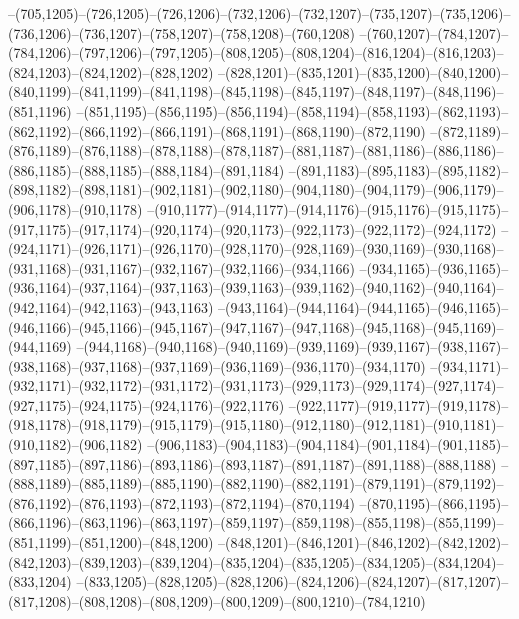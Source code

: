 --(705,1205)--(726,1205)--(726,1206)--(732,1206)--(732,1207)--(735,1207)--(735,1206)--(736,1206)--(736,1207)--(758,1207)--(758,1208)--(760,1208)
--(760,1207)--(784,1207)--(784,1206)--(797,1206)--(797,1205)--(808,1205)--(808,1204)--(816,1204)--(816,1203)--(824,1203)--(824,1202)--(828,1202)
--(828,1201)--(835,1201)--(835,1200)--(840,1200)--(840,1199)--(841,1199)--(841,1198)--(845,1198)--(845,1197)--(848,1197)--(848,1196)--(851,1196)
--(851,1195)--(856,1195)--(856,1194)--(858,1194)--(858,1193)--(862,1193)--(862,1192)--(866,1192)--(866,1191)--(868,1191)--(868,1190)--(872,1190)
--(872,1189)--(876,1189)--(876,1188)--(878,1188)--(878,1187)--(881,1187)--(881,1186)--(886,1186)--(886,1185)--(888,1185)--(888,1184)--(891,1184)
--(891,1183)--(895,1183)--(895,1182)--(898,1182)--(898,1181)--(902,1181)--(902,1180)--(904,1180)--(904,1179)--(906,1179)--(906,1178)--(910,1178)
--(910,1177)--(914,1177)--(914,1176)--(915,1176)--(915,1175)--(917,1175)--(917,1174)--(920,1174)--(920,1173)--(922,1173)--(922,1172)--(924,1172)
--(924,1171)--(926,1171)--(926,1170)--(928,1170)--(928,1169)--(930,1169)--(930,1168)--(931,1168)--(931,1167)--(932,1167)--(932,1166)--(934,1166)
--(934,1165)--(936,1165)--(936,1164)--(937,1164)--(937,1163)--(939,1163)--(939,1162)--(940,1162)--(940,1164)--(942,1164)--(942,1163)--(943,1163)
--(943,1164)--(944,1164)--(944,1165)--(946,1165)--(946,1166)--(945,1166)--(945,1167)--(947,1167)--(947,1168)--(945,1168)--(945,1169)--(944,1169)
--(944,1168)--(940,1168)--(940,1169)--(939,1169)--(939,1167)--(938,1167)--(938,1168)--(937,1168)--(937,1169)--(936,1169)--(936,1170)--(934,1170)
--(934,1171)--(932,1171)--(932,1172)--(931,1172)--(931,1173)--(929,1173)--(929,1174)--(927,1174)--(927,1175)--(924,1175)--(924,1176)--(922,1176)
--(922,1177)--(919,1177)--(919,1178)--(918,1178)--(918,1179)--(915,1179)--(915,1180)--(912,1180)--(912,1181)--(910,1181)--(910,1182)--(906,1182)
--(906,1183)--(904,1183)--(904,1184)--(901,1184)--(901,1185)--(897,1185)--(897,1186)--(893,1186)--(893,1187)--(891,1187)--(891,1188)--(888,1188)
--(888,1189)--(885,1189)--(885,1190)--(882,1190)--(882,1191)--(879,1191)--(879,1192)--(876,1192)--(876,1193)--(872,1193)--(872,1194)--(870,1194)
--(870,1195)--(866,1195)--(866,1196)--(863,1196)--(863,1197)--(859,1197)--(859,1198)--(855,1198)--(855,1199)--(851,1199)--(851,1200)--(848,1200)
--(848,1201)--(846,1201)--(846,1202)--(842,1202)--(842,1203)--(839,1203)--(839,1204)--(835,1204)--(835,1205)--(834,1205)--(834,1204)--(833,1204)
--(833,1205)--(828,1205)--(828,1206)--(824,1206)--(824,1207)--(817,1207)--(817,1208)--(808,1208)--(808,1209)--(800,1209)--(800,1210)--(784,1210)
